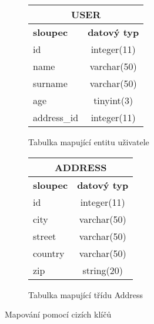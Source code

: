 \begin{figure}[!h]
\begin{subfigure}[b]{0.45\textwidth}
  \caption{Tabulka mapující entitu uživatele}
  \label{tab:user}
    \centering
    \begin{tabular}{|l|c|}
       \hline
       \multicolumn{2}{|c|}{\textbf{USER}} \\
       \hline    
       \textbf{sloupec} & \textbf{datový typ} \\
       \hline
       id & integer(11) \\
       \hline
       name & varchar(50) \\
       \hline
       surname & varchar(50) \\
       \hline
       age & tinyint(3) \\
       \hline
       address\_id & integer(11) \\
       \hline
    \end{tabular}
\end{subfigure}
\begin{subfigure}[b]{0.45\textwidth}
  \caption{Tabulka mapující třídu Address}
  \label{tab:address}
    \centering
    \begin{tabular}{|l|c|}
       \hline
       \multicolumn{2}{|c|}{\textbf{ADDRESS}} \\
       \hline    
       \textbf{sloupec} & \textbf{datový typ} \\
       \hline
       id & integer(11) \\
       \hline
       city & varchar(50) \\
       \hline
       street & varchar(50) \\
       \hline
       country & varchar(50) \\
       \hline
       zip & string(20) \\
       \hline
    \end{tabular}
\end{subfigure}
\caption{Mapování pomocí cizích klíčů}\label{fig:orm:fk}
\end{figure}

